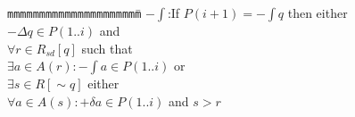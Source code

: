 
\begin{tabbing}
{\tt mmm}\={\tt mmmmmm}\={\tt mmmm}\={\tt mmmm}\={\tt mmmm}\=\kill
\>$-\int$:\>If $P(i + 1) = - \int q$ then either \\
\>\>$-\Delta q \in P(1..i)$ and \\
\>\>\>$\forall r \in R_{sd}[q]$ such that \\
\>\>\>\>$\exists a \in A(r): - \int a \in P(1..i)$ or \\
\>\>\>\>$\exists s \in R[\sim q]$ either \\
\>\>\>\>\>$\forall a \in A(s): + \delta a \in P(1..i)$ and $s > r$
\end{tabbing}
